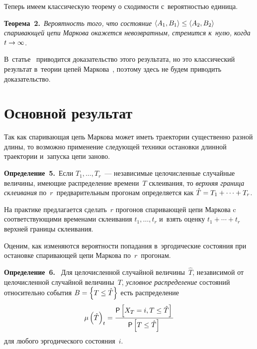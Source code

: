 \begin{multicols}{2}
    \smallskip
    
    Теперь имеем классическую теорему о схо\-ди\-мости с~вероятностью 
единица.
    
    \smallskip
    
    \noindent
    \textbf{Теорема~2.}\ \textit{Вероятность того, что состояние  
    $\langle A_1, B_1\rangle\hm \leq \langle A_2, B_2\rangle$
спаривающей цепи Маркова окажется невозвратным, стремится к~нулю, 
когда} $t\hm\to\infty$.
    
    \smallskip
    
    В~статье~\cite{10-vin} приводится доказательство этого результата, но 
это классический результат в~теории цепей Маркова~\cite{11-vin}, поэтому 
здесь не будем приводить доказательство.

\section{Основной результат}

    Так как спаривающая цепь Маркова может иметь траектории 
существенно разной длины, то возможно применение следующей техники 
остановки длинной траектории и~запуска цепи заново.
    
    \smallskip
    
    \noindent
    \textbf{Определение~5.}\ Если $T_1,\ldots ,T_r$~--- независимые 
целочисленные случайные величины, имеющие распределение времени~$T$ 
склеивания, то \textit{верхняя граница склеивания} 
по~$r$~предварительным прогонам определяется как $\hat{T}\hm= 
T_1+\cdots +T_r$.
    
    \smallskip
    
    На практике предлагается сделать~$r$ прогонов спаривающей цепи 
Маркова c соответствующими временами склеивания $t_1,\ldots , t_r$ и~взять 
оценку $t_1+\cdots +t_r$ верхней границы склеивания.
    
    Оценим, как изменяются вероятности попадания в~эргодические 
состояния при остановке спаривающей цепи Маркова по~$r$~прогонам.
    
    \smallskip
    
    \noindent
    \textbf{Определение~6.} \ Для целочисленной случайной 
величины~$\hat{T}$, независимой от целочисленной случайной 
величины~$T$, \textit{условное распределение} состояний относительно 
события $B\hm = \left\{ T\leq \hat{T}\right\}$ есть распределение 
    $$
    \mu\left( \hat{T}\right)_t= \displaystyle\frac{\displaystyle {\sf P}\left[ X_T=i, T\leq \hat{T}\right]\mathstrut}{\displaystyle {\sf P}\left[ 
T\leq \hat{T}\right]\mathstrut}
    $$
для любого эргодического состояния~$i$.


\end{multicols}
